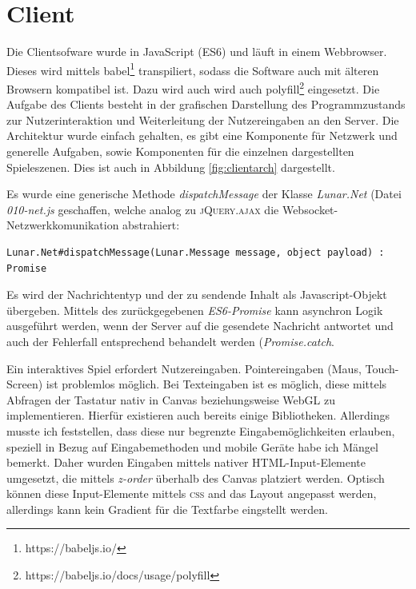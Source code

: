 \documentclass[ngerman,11pt]{report}
\begin{document}
\chapter{Client}

Die Clientsofware wurde in JavaScript (ES6) und läuft in einem Webbrowser. Dieses wird
mittels babel\footnote{https://babeljs.io/} transpiliert, sodass die Software auch mit
älteren Browsern kompatibel ist. Dazu wird auch wird auch
polyfill\footnote{https://babeljs.io/docs/usage/polyfill} eingesetzt. Die Aufgabe des Clients
besteht in der grafischen Darstellung des Programmzustands zur Nutzerinteraktion und
Weiterleitung der Nutzereingaben an den Server. Die Architektur wurde einfach gehalten,
es gibt eine Komponente für Netzwerk und generelle Aufgaben, sowie Komponenten für die
einzelnen dargestellten Spieleszenen. Dies ist auch in Abbildung \ref{fig:clientarch} dargestellt.

Es wurde eine generische Methode \textit{dispatchMessage} der Klasse \textit{Lunar.Net} (Datei \textit{010-net.js} geschaffen, welche analog zu \textsc{jQuery.ajax} die Websocket-Netzwerkkomunikation
abstrahiert:

\begin{lstlisting}
Lunar.Net#dispatchMessage(Lunar.Message message, object payload) : Promise
\end{lstlisting}

Es wird der Nachrichtentyp und der zu sendende Inhalt als Javascript-Objekt übergeben. Mittels
des zurückgegebenen \textit{ES6-Promise} kann asynchron Logik ausgeführt werden, wenn der Server
auf die gesendete Nachricht antwortet und auch der Fehlerfall entsprechend behandelt werden (\textit{Promise.catch}.

Ein interaktives Spiel erfordert Nutzereingaben. Pointereingaben (Maus, Touch-Screen) ist problemlos möglich. Bei Texteingaben ist es möglich, diese mittels Abfragen der Tastatur nativ in Canvas beziehungsweise WebGL zu implementieren. Hierfür existieren auch bereits einige Bibliotheken. Allerdings musste ich feststellen, dass diese nur begrenzte Eingabemöglichkeiten erlauben, speziell in Bezug auf Eingabemethoden und mobile Geräte habe ich Mängel bemerkt. Daher wurden Eingaben mittels nativer HTML-Input-Elemente umgesetzt, die mittels \textit{z-order} überhalb des Canvas platziert werden. Optisch können diese Input-Elemente mittels \textsc{css} and das Layout angepasst werden, allerdings kann kein Gradient für die Textfarbe eingstellt werden.
\end{document}
